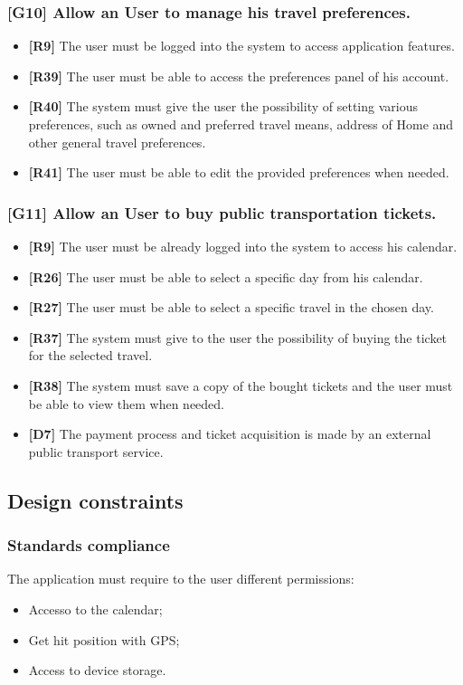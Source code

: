 \subsubsection{[G10] Allow an User to manage his travel preferences.}
\begin{itemize}
	\item \textbf{[R9]} The user must be logged into the system to access application features.
	\item \textbf{[R39]} The user must be able to access the preferences panel of his account.
	\item \textbf{[R40]} The system must give the user the possibility of setting various preferences, such as owned and preferred travel means, address of Home and other general travel preferences.
	\item \textbf{[R41]} The user must be able to edit the provided preferences when needed.
	
\end{itemize}
\subsubsection{[G11] Allow an User to buy public transportation tickets.}
\begin{itemize}
	\item \textbf{[R9]} The user must be already logged into the system to access his calendar.
	\item \textbf{[R26]} The user must be able to select a specific day from his calendar.
	\item \textbf{[R27]} The user must be able to select a specific travel in the chosen day.
	\item \textbf{[R37]} The system must give to the user the possibility of buying the ticket for the selected travel.
	\item \textbf{[R38]} The system must save a copy of the bought tickets and the user must be able to view them when needed.
	\item \textbf{[D7]} The payment process and ticket acquisition is made by an external public transport service.
\end{itemize}
\subsection{Design constraints}
\subsubsection{Standards compliance}
The application must require to the user different permissions:
\begin{itemize}
	\item Accesso to the calendar;
	\item Get hit position with GPS;
	\item Access to device storage.
\end{itemize}
